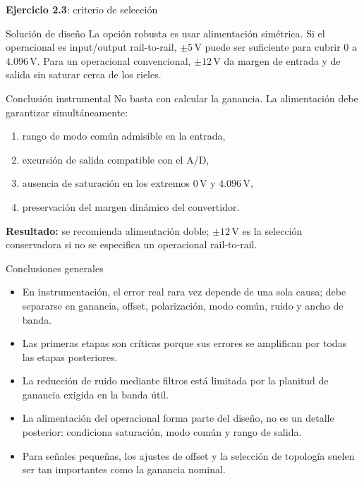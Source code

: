 \documentclass[aspectratio=169,9pt]{beamer}
\newcommand{\exercise}[1]{\textbf{Ejercicio #1}}
\newcommand{\result}[1]{\textbf{\color{eiTeal}Resultado:} #1}
\newcommand{\unit}[1]{\,\mathrm{#1}}
\begin{document}
\begin{frame}{\exercise{2.3}: criterio de selección}
  \begin{block}{Solución de diseño}
    La opción robusta es usar alimentación simétrica. Si el operacional es input/output rail-to-rail, \(\pm 5\unit{V}\) puede ser suficiente para cubrir \(0\) a \(4.096\unit{V}\). Para un operacional convencional, \(\pm 12\unit{V}\) da margen de entrada y de salida sin saturar cerca de los rieles.
  \end{block}

  \begin{block}{Conclusión instrumental}
    No basta con calcular la ganancia. La alimentación debe garantizar simultáneamente:
    \begin{enumerate}
      \item rango de modo común admisible en la entrada,
      \item excursión de salida compatible con el A/D,
      \item ausencia de saturación en los extremos \(0\unit{V}\) y \(4.096\unit{V}\),
      \item preservación del margen dinámico del convertidor.
    \end{enumerate}
  \end{block}

  \result{se recomienda alimentación doble; \(\pm 12\unit{V}\) es la selección conservadora si no se especifica un operacional rail-to-rail.}
\end{frame}

\begin{frame}{Conclusiones generales}
  \begin{itemize}
    \item En instrumentación, el error real rara vez depende de una sola causa; debe separarse en ganancia, offset, polarización, modo común, ruido y ancho de banda.
    \item Las primeras etapas son críticas porque sus errores se amplifican por todas las etapas posteriores.
    \item La reducción de ruido mediante filtros está limitada por la planitud de ganancia exigida en la banda útil.
    \item La alimentación del operacional forma parte del diseño, no es un detalle posterior: condiciona saturación, modo común y rango de salida.
    \item Para señales pequeñas, los ajustes de offset y la selección de topología suelen ser tan importantes como la ganancia nominal.
  \end{itemize}
\end{frame}
\end{document}
